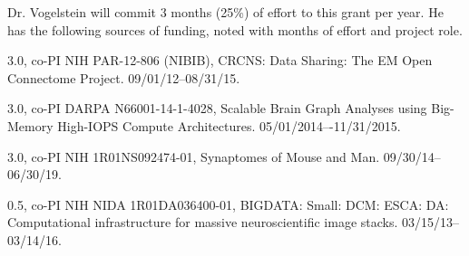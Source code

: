 \vspace{10pt}

  Dr. Vogelstein will commit 3 months (25\%) of effort to this grant per year.  He has the following sources of funding, noted with months of effort and project role.
\small

\vspace{-5pt}

\begin{list}{[]}{\settowidth{\labelwidth}{0.72 mos., co-PI}\leftmargin{}\advance\leftmargin 0.2in \setlength{\labelsep}{0.2in}}
\addtolength{\itemsep}{-4pt}

\item[3.0, co-PI] NIH PAR-12-806 (NIBIB), CRCNS: Data Sharing: The EM Open Connectome Project. 
09/01/12--08/31/15.

\item[3.0, co-PI] DARPA N66001-14-1-4028, Scalable Brain Graph Analyses using Big-Memory High-IOPS Compute Architectures. 05/01/2014–-11/31/2015.

\item[3.0, co-PI] NIH 1R01NS092474-01, Synaptomes of Mouse and Man.  09/30/14--06/30/19.

\item[0.5, co-PI] NIH NIDA 1R01DA036400-01, BIGDATA: Small: DCM: ESCA: DA: Computational infrastructure for massive neuroscientific image stacks. 03/15/13--03/14/16.
\end{list}


